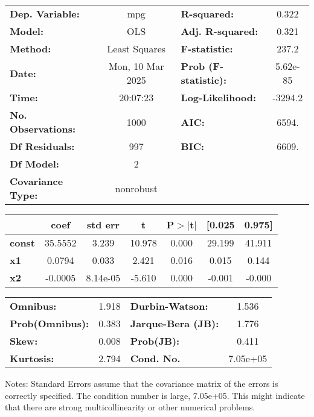 \begin{center}
\begin{tabular}{lclc}
\toprule
\textbf{Dep. Variable:}    &       mpg        & \textbf{  R-squared:         } &     0.322   \\
\textbf{Model:}            &       OLS        & \textbf{  Adj. R-squared:    } &     0.321   \\
\textbf{Method:}           &  Least Squares   & \textbf{  F-statistic:       } &     237.2   \\
\textbf{Date:}             & Mon, 10 Mar 2025 & \textbf{  Prob (F-statistic):} &  5.62e-85   \\
\textbf{Time:}             &     20:07:23     & \textbf{  Log-Likelihood:    } &   -3294.2   \\
\textbf{No. Observations:} &        1000      & \textbf{  AIC:               } &     6594.   \\
\textbf{Df Residuals:}     &         997      & \textbf{  BIC:               } &     6609.   \\
\textbf{Df Model:}         &           2      & \textbf{                     } &             \\
\textbf{Covariance Type:}  &    nonrobust     & \textbf{                     } &             \\
\bottomrule
\end{tabular}
\begin{tabular}{lcccccc}
               & \textbf{coef} & \textbf{std err} & \textbf{t} & \textbf{P$> |$t$|$} & \textbf{[0.025} & \textbf{0.975]}  \\
\midrule
\textbf{const} &      35.5552  &        3.239     &    10.978  &         0.000        &       29.199    &       41.911     \\
\textbf{x1}    &       0.0794  &        0.033     &     2.421  &         0.016        &        0.015    &        0.144     \\
\textbf{x2}    &      -0.0005  &     8.14e-05     &    -5.610  &         0.000        &       -0.001    &       -0.000     \\
\bottomrule
\end{tabular}
\begin{tabular}{lclc}
\textbf{Omnibus:}       &  1.918 & \textbf{  Durbin-Watson:     } &    1.536  \\
\textbf{Prob(Omnibus):} &  0.383 & \textbf{  Jarque-Bera (JB):  } &    1.776  \\
\textbf{Skew:}          &  0.008 & \textbf{  Prob(JB):          } &    0.411  \\
\textbf{Kurtosis:}      &  2.794 & \textbf{  Cond. No.          } & 7.05e+05  \\
\bottomrule
\end{tabular}
\end{center}

Notes: \newline
 [1] Standard Errors assume that the covariance matrix of the errors is correctly specified. \newline
 [2] The condition number is large, 7.05e+05. This might indicate that there are \newline
 strong multicollinearity or other numerical problems.